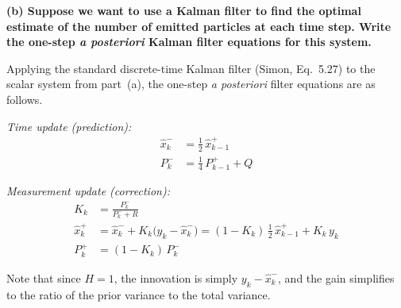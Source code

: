 \documentclass[12pt]{article}
\begin{document}
\begin{stepbox}
\textbf{(b) Suppose we want to use a Kalman filter to find the optimal estimate of the number of emitted particles at each time step. Write the one-step \textit{a posteriori} Kalman filter equations for this system.}

\vspace{0.3cm}

Applying the standard discrete-time Kalman filter (Simon, Eq.~5.27) to the scalar system from part~(a), the one-step \textit{a posteriori} filter equations are as follows.

\textit{Time update (prediction):}
\begin{align}
\hat{x}_k^- &= \tfrac{1}{2}\,\hat{x}_{k-1}^+ \label{eq:5.1_xpred} \\
P_k^- &= \tfrac{1}{4}\,P_{k-1}^+ + Q \label{eq:5.1_Ppred}
\end{align}

\textit{Measurement update (correction):}
\begin{align}
K_k &= \frac{P_k^-}{P_k^- + R} \label{eq:5.1_gain} \\
\hat{x}_k^+ &= \hat{x}_k^- + K_k\bigl(y_k - \hat{x}_k^-\bigr) = (1 - K_k)\,\tfrac{1}{2}\,\hat{x}_{k-1}^+ + K_k\, y_k \label{eq:5.1_xupd} \\
P_k^+ &= (1 - K_k)\,P_k^- \label{eq:5.1_Pupd}
\end{align}

Note that since $H = 1$, the innovation is simply $y_k - \hat{x}_k^-$, and the gain simplifies to the ratio of the prior variance to the total variance.

\end{stepbox}
\end{document}
